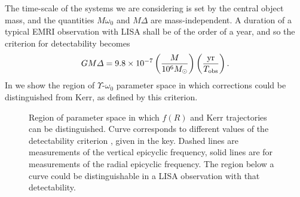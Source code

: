 The time-scale of the systems we are considering is set by the central object mass, and the quantities $M\omega_0$ and $M\Delta$ are mass-independent. A duration of a typical EMRI observation with LISA shall be of the order of a year, and so the criterion for detectability becomes
\begin{equation}
GM\Delta = 9.8\times10^{-7} \left(\frac{M}{10^6 M_{\odot}}\right) \left(\frac{\mathrm{yr}}{T_\mathrm{obs}}\right). \label{eq:detcrit}
\end{equation}
In  we show the region of $\Upsilon$-$\omega_0$ parameter space in which corrections could be distinguished from Kerr, as defined by this criterion.
\begin{figure}[htbp]
\centering
{}
\quad{}
\caption{\label{fig:epifig}Region of parameter space in which $f(R)$ and Kerr trajectories can be distinguished. Curve corresponds to different values of the detectability criterion , given in the key. Dashed lines are measurements of the vertical epicyclic frequency, solid lines are for measurements of the radial epicyclic frequency. The region below a curve could be distinguishable in a LISA observation with that detectability.}
\end{figure}
